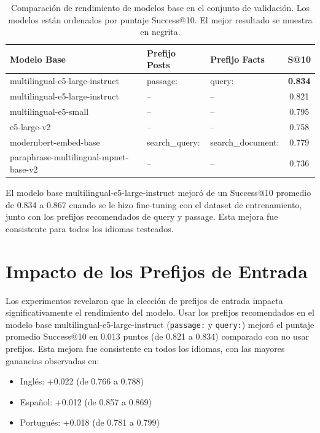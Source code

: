 \documentclass[a4paper,openany]{memoir}
\begin{document}
\begin{table}[htbp]
  \centering
  \caption{Comparación de rendimiento de modelos base en el conjunto de validación. Los modelos están ordenados por puntaje Success@10. El mejor resultado se muestra en negrita.}
  \label{tab:base-models}
  \begin{tabular}{p{5cm}p{2.5cm}p{2.5cm}c}
    \toprule
    \textbf{Modelo Base} & \textbf{Prefijo Posts} & \textbf{Prefijo Facts} & \textbf{S@10} \\
    \midrule
    multilingual-e5-large-instruct & passage: & query: & \textbf{0.834} \\
    multilingual-e5-large-instruct & -- & -- & 0.821 \\
    multilingual-e5-small & -- & -- & 0.795 \\
    e5-large-v2 & -- & -- & 0.758 \\
    modernbert-embed-base & search\_query: & search\_document: & 0.779 \\
    paraphrase-multilingual-mpnet-base-v2 & -- & -- & 0.736 \\
    \bottomrule
  \end{tabular}
\end{table}

El modelo base multilingual-e5-large-instruct mejoró de un Success@10 promedio de 0.834 a 0.867 cuando se le hizo fine-tuning con el dataset de entrenamiento, junto con los prefijos recomendados de query y passage. Esta mejora fue consistente para todos los idiomas testeados.

\section{Impacto de los Prefijos de Entrada}

Los experimentos revelaron que la elección de prefijos de entrada impacta significativamente el rendimiento del modelo. Usar los prefijos recomendados en el modelo base multilingual-e5-large-instruct (\texttt{passage:} y \texttt{query:}) mejoró el puntaje promedio Success@10 en 0.013 puntos (de 0.821 a 0.834) comparado con no usar prefijos. Esta mejora fue consistente en todos los idiomas, con las mayores ganancias observadas en:

\begin{itemize}
    \item Inglés: +0.022 (de 0.766 a 0.788)
    \item Español: +0.012 (de 0.857 a 0.869)
    \item Portugués: +0.018 (de 0.781 a 0.799)
\end{itemize}
\end{document}
